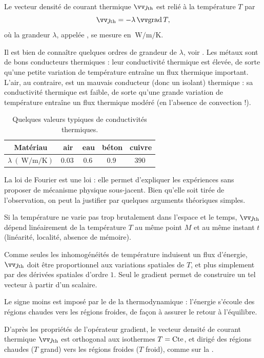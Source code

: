 \documentclass[12pt,fancy]{cours}
\begin{document}
\begin{theorem}\label{form:fourier}
  Le vecteur densité de courant thermique $\Vec{\jth}$ est relié à la température $T$ par
\begin{equation*}
\Vec{\jth}=-\lambda\,\Grad{T},
\end{equation*}
où la grandeur $\lambda$, appelée , se mesure en $\SI{}{\watt\per\meter\per\kelvin}$.
\end{theorem}
\noindent  Il est bien de connaître quelques ordres de grandeur de $\lambda$, voir . Les métaux sont de bons conducteurs thermiques : leur conductivité thermique est élevée, de sorte qu’une petite variation de température entraîne un flux thermique important. L’air, au contraire, est un mauvais conducteur (donc un isolant) thermique : sa conductivité thermique est faible, de sorte qu’une grande variation de température entraîne un flux thermique modéré (en l’absence de convection !).
\begin{table}[H]
  \centering
  \begin{tabular}{|c|c|c|c|c|}
  \hline
  Matériau & air & eau & béton & cuivre \\
  \hline
  $\lambda ~(\SI{}{\watt\per\meter\per\kelvin})$ & $\SI{0,03}{}$  & $\SI{0,6}{}$ & $\SI{0,9}{}$ & $\SI{390}{}$ \\
  \hline
  \end{tabular}
  \caption{Quelques valeurs typiques de conductivités thermiques.}
  \label{tab:lambda}
  \end{table}

La loi de Fourier est une loi  : elle permet d’expliquer les expériences sans proposer de mécanisme physique sous-jacent. Bien qu’elle soit tirée de l’observation, on peut la justifier par quelques arguments théoriques simples. %
\begin{liste}
\item Si la température ne varie pas trop brutalement dans l'espace et le temps,
$\Vec{\jth}$ dépend linéairement de la température $T$ au même point $M$ et au même instant $t$ (linéarité, localité, absence de mémoire).
 \item Comme seules les inhomogénéités de température induisent un flux d’énergie, $\Vec{\jth}$ doit être proportionnel aux variations spatiales de $T$, et plus simplement par des dérivées spatiales d'ordre $1$. Seul le gradient permet de construire un tel vecteur à partir d'un scalaire.
 
 \item Le signe moins est imposé par le  de la thermodynamique : l’énergie s’écoule des régions chaudes vers les régions froides, de façon à assurer le retour à l’équilibre.
\end{liste}
D'après les propriétés de l'opérateur gradient, le vecteur densité de courant thermique $\Vec{\jth}$ est orthogonal aux isothermes $T=\text{Cte}$, et dirigé des régions chaudes ($T$ grand) vers les régions froides ($T$ froid), comme sur la .
\end{document}
